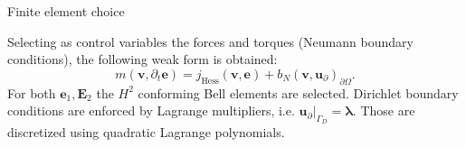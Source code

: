 \documentclass[aspectratio=169]{ISAE-Beamer}
\begin{document}
\begin{frame}{Finite element choice}
\begin{overlayarea}{\textwidth}{\textheight}
Selecting as control variables the forces and torques (Neumann boundary conditions), the following weak form is obtained:
\[ m(\bm{v}, \partial_t \bm{e}) = j_{\text{Hess}}(\bm{v}, \bm{e}) + b_N(\bm{v}, \bm{u}_\partial)_{\partial \Omega}.
\]
For both $\bm{e}_1, \bm{E}_2$ the $H^2$ conforming Bell elements are selected.  Dirichlet boundary conditions are enforced by Lagrange multipliers, i.e. $\bm{u}_\partial\vert_{\Gamma_D} = \bm{\lambda}$. Those are discretized using quadratic Lagrange polynomials.
\end{overlayarea}
\end{frame}
\end{document}
